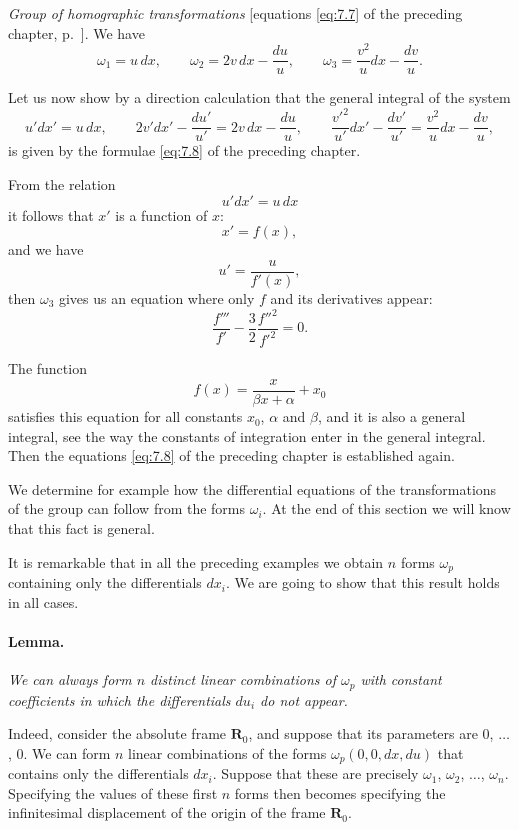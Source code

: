 {\somespace

\emph{Group of homographic transformations} [equations \eqref{eq:7.7} of the preceding chapter, p.~\pageref{eq:7.7}]. We have
\begin{equation}
  \label{eq:8.9}
  \omega_{1}=u\,dx,\qquad\omega_{2}=2v\,dx-\frac{du}{u},\qquad\omega_{3}=\frac{v^{2}}{u}dx-\frac{dv}{u}.
\end{equation}

Let us now show by a direction calculation that the general integral of the system
\[
u'dx'=u\,dx,\qquad 2v'dx'-\frac{du'}{u'}=2v\,dx-\frac{du}{u},\qquad\frac{v'^{2}}{u'}dx'-\frac{dv'}{u'}=\frac{v^{2}}{u}dx-\frac{dv}{u},
\]
is given by the formulae \eqref{eq:7.8} of the preceding chapter.

From the relation
\[
u'dx'=u\,dx
\]
it follows that $x'$ is a function of $x$:
\[
x'=f(x),
\]
and we have
\[
u'=\frac{u}{f'(x)},
\]
then $\omega_{3}$ gives us an equation where only $f$ and its derivatives appear:
\begin{equation}
  \label{eq:8.10}
  \frac{f'''}{f'}-\frac{3}{2}\frac{f''^{2}}{f'^{2}}=0.
\end{equation}

The function
\[
f(x)=\frac{x}{\beta x+\alpha}+x_{0}
\]
satisfies this equation for all constants $x_{0}$, $\alpha$ and $\beta$, and it is also a general integral, see the way the constants of integration enter in the general integral. Then the equations \eqref{eq:7.8} of the preceding chapter is established again.

We determine for example how the differential equations of the transformations of the group can follow from the forms $\omega_{i}$. At the end of this section we will know that this fact is general.

\somespace
}

It is remarkable that in all the preceding examples we obtain $n$ forms $\omega_{p}$ containing only the differentials $dx_{i}$. We are going to show that this result holds in all cases.


\paragraph{Lemma.}
\label{sec:109}
\emph{We can always form $n$ distinct linear combinations of $\omega_{p}$ with constant coefficients in which the differentials $du_{i}$ do not appear.}

\somespace

Indeed, consider the absolute frame $\mathbf{R}_{0}$, and suppose that its parameters are $0$, $\dots$, $0$. We can form $n$ linear combinations of the forms $\omega_{p}(0,0,dx,du)$ that contains only the differentials $dx_{i}$. Suppose that these are precisely $\omega_{1}$, $\omega_{2}$, $\dots$, $\omega_{n}$. Specifying the values of these first $n$ forms then becomes specifying the infinitesimal displacement of the origin of the frame $\mathbf{R}_{0}$.

